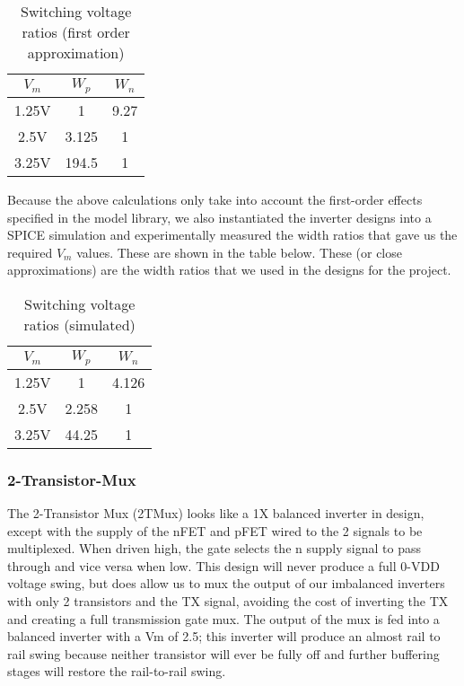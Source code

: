 \documentclass[12pt, letterpaper]{article}
\begin{document}
\begin{table}[htb]
    \centering
    \begin{tabular}{c c c}
        $V_m$ & $W_p$ & $W_n$ \\
        \hline
        1.25V & 1     & 9.27 \\
        2.5V  & 3.125 & 1 \\
        3.25V & 194.5 & 1 \\
        \hline
    \end{tabular}
    \caption{Switching voltage ratios (first order approximation)}
\end{table}

Because the above calculations only take into account the first-order effects specified in the model library, we also instantiated the inverter designs into a SPICE simulation and experimentally measured the width ratios that gave us the required $V_m$ values.
These are shown in the table below.
These (or close approximations) are the width ratios that we used in the designs for the project.

\begin{table}[htb]
    \centering
    \begin{tabular}{c c c}
        $V_m$ & $W_p$ & $W_n$ \\
        \hline
        1.25V & 1     & 4.126 \\
        2.5V  & 2.258 & 1 \\
        3.25V & 44.25 & 1 \\
        \hline
    \end{tabular}
    \caption{Switching voltage ratios (simulated)}
\end{table}

\subsubsection{2-Transistor-Mux}
The 2-Transistor Mux (2TMux) looks like a 1X balanced inverter in design, except with the supply of the nFET and pFET wired to the 2 signals to be multiplexed.
When driven high, the gate selects the n supply signal to pass through and vice versa when low.
This design will never produce a full 0-VDD voltage swing, but does allow us to mux the output of our imbalanced inverters with only 2 transistors and the TX signal, avoiding the cost of inverting the TX and creating a full transmission gate mux.
The output of the mux is fed into a balanced inverter with a Vm of 2.5; this inverter will produce an almost rail to rail swing because neither transistor will ever be fully off and further buffering stages will restore the rail-to-rail swing.
\end{document}
